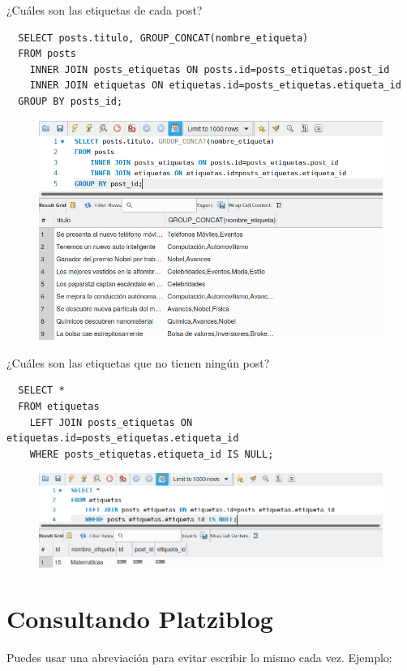 \documentclass{article}
\begin{document}
¿Cuáles son las etiquetas de cada post?\\
\begin{verbatim}
  SELECT posts.titulo, GROUP_CONCAT(nombre_etiqueta)
  FROM posts
    INNER JOIN posts_etiquetas ON posts.id=posts_etiquetas.post_id
    INNER JOIN etiquetas ON etiquetas.id=posts_etiquetas.etiqueta_id
  GROUP BY posts_id;
\end{verbatim}

\begin{figure}[h!]
  \centering
  \includegraphics[scale=0.75]{./Pictures/136_second_question.png}
\end{figure}


¿Cuáles son las etiquetas que no tienen ningún post?
\begin{verbatim}
  SELECT *
  FROM etiquetas
    LEFT JOIN posts_etiquetas ON etiquetas.id=posts_etiquetas.etiqueta_id
    WHERE posts_etiquetas.etiqueta_id IS NULL;
\end{verbatim}

\begin{figure}[h!]
  \centering
  \includegraphics[scale=0.75]{./Pictures/137_third_question.png}
\end{figure}


\section{Consultando Platziblog}%
Puedes usar una abreviación para evitar escribir lo mismo cada vez. Ejemplo:\\
\end{document}
